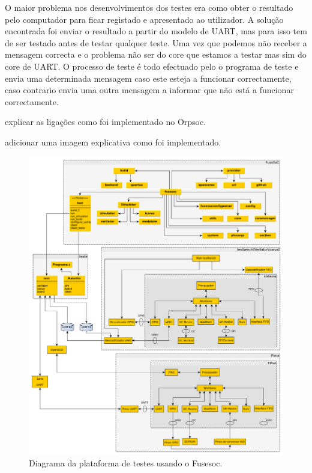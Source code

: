 O maior problema nos desenvolvimentos dos testes era como obter o resultado pelo computador para ficar registado e apresentado ao utilizador. A solução encontrada foi enviar o resultado a partir do modelo de UART, mas para isso tem de ser testado antes de testar qualquer teste. Uma vez que podemos não receber a mensagem correcta e o problema não ser do core que estamos a testar mas sim do core de UART. O processo de teste é todo efectuado pelo o programa de teste e envia uma determinada mensagem caso este esteja a funcionar correctamente, caso contrario envia uma outra mensagem a informar que não está a funcionar correctamente.

 
explicar as ligações
como foi implementado no Orpsoc. 

adicionar uma imagem explicativa como foi implementado.
\begin{figure}[!htb]
  \centering
  \includegraphics[width=1.00\textwidth]{grafos/Fusesoc_teste.pdf}
  \caption[Diagrama de da plataforma de testes usando o Fusesoc]{Diagrama da plataforma de testes usando o Fusesoc.}
  \label{fig:fusesoc_teste}
\end{figure}


